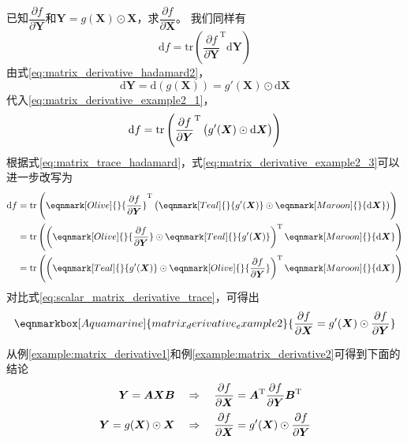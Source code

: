 \begin{example}\label{example:matrix_derivative2}
\colorbox{Aquamarine!30}{已知$\dfrac{\partial f}{\partial \bm{Y}}$和$\bm{Y}=g(\bm{X})\odot\bm{X}$，求$\dfrac{\partial f}{\partial \bm{X}}$}。
我们同样有
\begin{equation}
	\mathrm{d}f = \mathrm{tr}\left({\frac{\partial f}{\partial \bm{Y}}}^{\mathrm{T}}\mathrm{d}\bm{Y}\right)
	\label{eq:matrix_derivative_example2_1}
\end{equation}
由式\eqref{eq:matrix_derivative_hadamard2}，
\begin{equation}
	\mathrm{d}\bm{Y} = \mathrm{d}\left(g(\bm{X})\right) = g'(\bm{X}) \odot \mathrm{d}\bm{X}
	\label{eq:matrix_derivative_example2_2}
\end{equation}
代入\eqref{eq:matrix_derivative_example2_1}，
\begin{equation}
	\mathrm{d}f = \mathrm{tr}\left({\frac{\partial f}{\partial \bm{Y}}}^{\mathrm{T}}\left(\vphantom{A^T}g'(\bm{X}) \odot \mathrm{d}\bm{X}\right)\right)
	\label{eq:matrix_derivative_example2_3}
\end{equation}
根据式\eqref{eq:matrix_trace_hadamard}，式\eqref{eq:matrix_derivative_example2_3}可以进一步改写为
\begin{equation}
	\begin{aligned}
		\mathrm{d}f 
		&= \mathrm{tr}\left(\eqnmark[Olive]{}{\frac{\partial f}{\partial \bm{Y}}}^{\mathrm{T}}\left(\vphantom{A^T}\eqnmark[Teal]{}{g'(\bm{X})} \odot \eqnmark[Maroon]{}{\mathrm{d}\bm{X}}\right)\right) \\
		&= \mathrm{tr}\left(\left({\eqnmark[Olive]{}{\frac{\partial f}{\partial \bm{Y}}}\odot \eqnmark[Teal]{}{g'(\bm{X})}}\right)^{\mathrm{T}}\eqnmark[Maroon]{}{\mathrm{d}\bm{X}}\right) \\
		&= \mathrm{tr}\left(\left({\eqnmark[Teal]{}{g'(\bm{X})} \odot \eqnmark[Olive]{}{\frac{\partial f}{\partial \bm{Y}}}}\right)^{\mathrm{T}}\eqnmark[Maroon]{}{\mathrm{d}\bm{X}}\right)
	\end{aligned}
\end{equation}
对比式\eqref{eq:scalar_matrix_derivative_trace}，可得出
\renewcommand{\eqnhighlightshade}{30}  %
\begin{equation}
	\eqnmarkbox[Aquamarine]{matrix_derivative_example2}{
	\frac{\partial f}{\partial \bm{X}} = g'(\bm{X}) \odot \frac{\partial f}{\partial \bm{Y}}
	}
	\label{eq:matrix_derivative_example2_4}
\end{equation}
\end{example}

\vspace{0.5\baselineskip}
从例\ref{example:matrix_derivative1}和例\ref{example:matrix_derivative2}可得到下面的结论
\begin{align}
	\bm{Y}=\bm{A}\bm{X}\bm{B} \quad &\Rightarrow \quad \frac{\partial f}{\partial \bm{X}} = \bm{A}^{\mathrm{T}}\frac{\partial f}{\partial \bm{Y}}\bm{B}^{\mathrm{T}}
	\label{eq:matrix_derivative_conclusion1} \\ %
	\bm{Y}=g(\bm{X})\odot\bm{X} \quad &\Rightarrow \quad \frac{\partial f}{\partial \bm{X}} = g'(\bm{X}) \odot \frac{\partial f}{\partial \bm{Y}} \vphantom{{\frac{\partial f}{\partial \bm{X}}}^{\mathrm{T}}}
	\label{eq:matrix_derivative_conclusion2}  %
\end{align}
